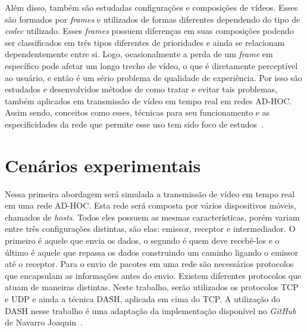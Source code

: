 \documentclass[12pt]{article}
\begin{document}
    Além disso, também são estudadas configurações e composições de vídeos. Esses são formados por \textit{frames} e utilizados de formas diferentes dependendo do tipo de \textit{codec} utilizado. Esses \textit{frames} possuem diferenças em suas composições podendo ser classificados em três tipos diferentes de prioridades e ainda se relacionam dependentemente entre si. Logo, ocasionalmente a perda de um \textit{frame} em específico pode afetar um longo trecho de vídeo, o que é diretamente perceptível ao usuário, e então é um sério problema de qualidade de experiência. Por isso são estudados e desenvolvidos métodos de como tratar e evitar tais problemas, também aplicados em transmissão de vídeo em tempo real em redes AD-HOC. Assim sendo, conceitos como esses, técnicas para seu funcionamento e as especificidades da rede que permite esse uso tem sido foco de estudos~\cite{Immich2018}.
    
\section{Cenários experimentais} \label{sec:cenariosexp}

	Nessa primeira abordagem será simulada a transmissão de vídeo em tempo real em uma rede AD-HOC. Esta rede será composta por vários dispositivos móveis, chamados de \textit{hosts}. Todos eles possuem as mesmas características, porém variam entre três configurações distintas, são elas: emissor, receptor e intermediador. O primeiro é aquele que envia os dados, o segundo é quem deve recebê-los e o último é aquele que repassa os dados construindo um caminho ligando o emissor até o receptor. Para o envio de pacotes em uma rede são necessários protocolos que encapsulam as informações antes do envio. Existem diferentes protocolos que atuam de maneiras distintas. Neste trabalho, serão utilizados os protocolos TCP e UDP e ainda a técnica DASH, aplicada em cima do TCP. A utilização do DASH nesse trabalho é uma adaptação da implementação disponível no \textit{GitHub} de Navarro Joaquin~\cite{navarro}.%
    
\end{document}
